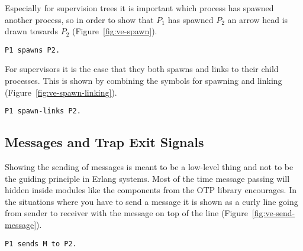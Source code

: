 \documentclass[a4paper, pdftex]{tufte-handout}
\begin{document}
\newpage

Especially for supervision trees it is important which process has spawned another
process, so in order to show that $P_1$ has spawned $P_2$ an arrow head is drawn
towards $P_2$ (Figure~\ref{fig:ve-spawn}).

\begin{marginfigure}
  \centering
  \caption{\texttt{P1 spawns P2.}}
  \label{fig:ve-spawn}
\end{marginfigure}

For supervisors it is the case that they both spawns and links to their child
processes. This is shown by combining the symbols for spawning and linking
(Figure~\ref{fig:ve-spawn-linking}).

\begin{marginfigure}
  \centering
  \caption{\texttt{P1 spawn-links P2.}}
  \label{fig:ve-spawn-linking}
\end{marginfigure}


\subsection{Messages and Trap Exit Signals}
\label{sec:messages-trap-exit}

Showing the sending of messages is meant to be a low-level thing and not to be the
guiding principle in Erlang systems. Most of the time message passing will hidden
inside modules like the components from the OTP library encourages. In the situations
where you have to send a message it is shown as a curly line going from sender to
receiver with the message on top of the line (Figure~\ref{fig:ve-send-message}).

\begin{marginfigure}
  \centering
  \caption{\texttt{P1 sends M to P2.}}
  \label{fig:ve-send-message}
\end{marginfigure}
\end{document}
